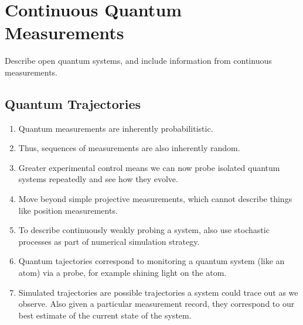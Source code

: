 \section{Continuous Quantum Measurements}

Describe open quantum systems, and include information from continuous measurements. 

\subsection{Quantum Trajectories}

\begin{enumerate}
\item Quantum measurements are inherently probabilitistic.  
\item Thus, sequences of measurements are also inherently random.  
\item Greater experimental control means we can now probe isolated quantum systems repeatedly and see how they evolve.  
\item Move beyond simple projective measurements, which cannot describe things like position measurements.
\item To describe continuously weakly probing a system, also use stochastic processes as part of
 numerical simulation strategy.
\item Quantum tajectories correspond to monitoring a quantum system (like an atom) via a probe,
 for example shining light on the atom. \cite{Carmichael1993}
\item Simulated trajectories are possible trajectories a system could trace out as we observe.
  Also given a particular measurement record, they correspond to our best estimate of the current state of the system.  
\end{enumerate}




